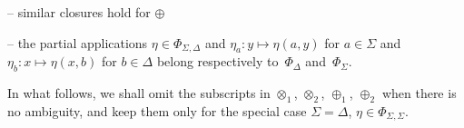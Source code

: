 \noindent -- 
similar closures hold for $\oplus$

\noindent -- 
the partial applications $\eta \in \Phi_{\Sigma, \Delta}$
and $\eta_a: y \mapsto \eta(a, y)$ for $a \in \Sigma$ %
and\\ 
\phantom{--} $\eta_b: x \mapsto \eta(x, b)$ for $b \in \Delta$ %
belong respectively to~$\Phi_\Delta$ and~$\Phi_\Sigma$.

\medskip\noindent
In what follows, we shall omit the subscripts in 
$\otimes_1$, $\otimes_2$, $\oplus_1$, $\oplus_2$
when there is no ambiguity, 
and keep them only for the special case $\Sigma = \Delta$,
\ie $\eta \in \Phi_{\Sigma, \Sigma}$. %

%

